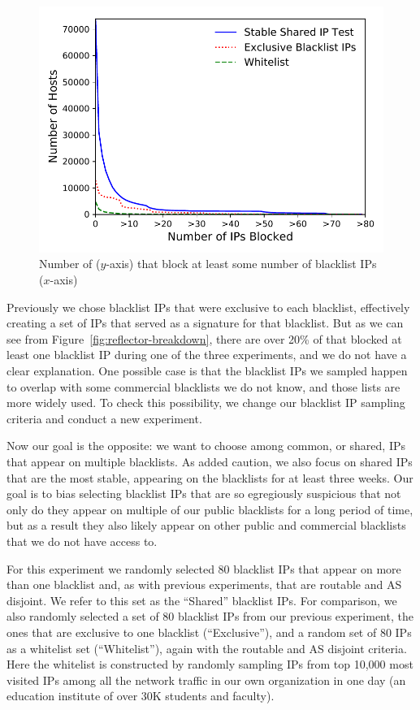 \begin{figure}[t]
\centering
\includegraphics[width=0.8\columnwidth]{data_usage/images/large_scale_rcdf_v2.pdf}
\caption{Number of {} ($y$-axis) that block at least
  some number of blacklist IPs ($x$-axis)}
\label{fig:large_scale_rcdf}
\end{figure}


Previously we chose blacklist IPs that were exclusive to each
blacklist, effectively creating a set of IPs that served as a
signature for that blacklist. But as we can see from Figure~\ref{fig:reflector-breakdown},
there are over 20\% of {} that blocked at least one
blacklist IP during one of the three experiments, and we do not
have a clear explanation. One possible case is that the blacklist IPs
we sampled happen to overlap with some commercial blacklists we
do not know, and those lists are more widely used. To check this
possibility, we change our blacklist IP sampling criteria and conduct
a new experiment.

Now our goal is the opposite: we want
to choose among common, or shared, IPs that appear on multiple
blacklists.  As added caution, we also focus on shared IPs that are
the most stable, appearing on the blacklists for at least three weeks.
Our goal is to bias selecting blacklist IPs that are so egregiously
suspicious that not only do they appear on multiple of our public
blacklists for a long period of time, but as a result they also likely
appear on other public and commercial blacklists that we do not have
access to.


For this experiment we randomly selected 80 blacklist IPs that appear
on more than one blacklist and, as with previous experiments, that are
routable and AS disjoint.  We refer to this set as the ``Shared''
blacklist IPs.  For comparison, we also randomly selected a set of 80
blacklist IPs from our previous experiment, the ones that are
exclusive to one blacklist (``Exclusive''), and a random set of 80 IPs
as a whitelist set (``Whitelist''), again with the routable and AS disjoint
criteria. Here the whitelist is constructed by randomly sampling IPs
from top 10,000 most visited IPs among all the network traffic in our own
organization in one day (an education institute of over 30K students
and faculty).


